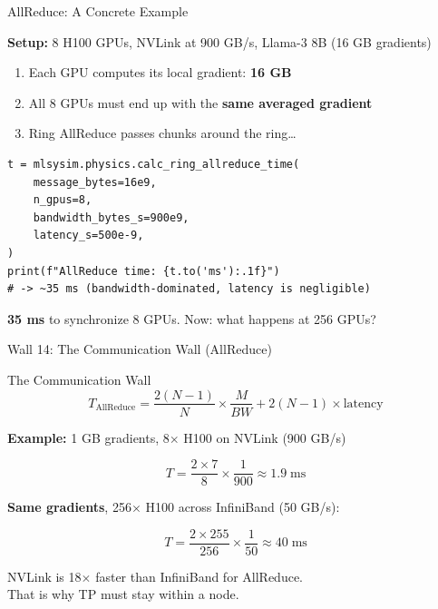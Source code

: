 \documentclass[aspectratio=169, 12pt]{beamer}
\newcommand{\wallbox}[2]{%
  \begin{block}{#1}#2\end{block}%
}
\begin{document}
\begin{frame}[fragile]{AllReduce: A Concrete Example}

\small
\textbf{Setup:} 8 H100 GPUs, NVLink at 900 GB/s, Llama-3 8B (16 GB gradients)

\vspace{0.3cm}
\begin{enumerate}
\item Each GPU computes its local gradient: \textbf{16 GB}
\item All 8 GPUs must end up with the \textbf{same averaged gradient}
\item Ring AllReduce passes chunks around the ring\ldots
\end{enumerate}

\vspace{0.3cm}
\begin{lstlisting}
t = mlsysim.physics.calc_ring_allreduce_time(
    message_bytes=16e9,
    n_gpus=8,
    bandwidth_bytes_s=900e9,
    latency_s=500e-9,
)
print(f"AllReduce time: {t.to('ms'):.1f}")
# -> ~35 ms (bandwidth-dominated, latency is negligible)
\end{lstlisting}

\vfill
\centering
\textbf{35 ms} to synchronize 8 GPUs. Now: what happens at 256 GPUs?
\end{frame}

\begin{frame}{Wall 14: The Communication Wall (AllReduce)}

\small
\wallbox{The Communication Wall}{
\[
  T_{\text{AllReduce}} = \frac{2(N-1)}{N} \times \frac{M}{BW}
    + 2(N-1) \times \text{latency}
\]
}

\vspace{0.2cm}
\textbf{Example:} 1 GB gradients, 8$\times$ H100 on NVLink (900 GB/s)

\[
T = \frac{2 \times 7}{8} \times \frac{1}{900} \approx 1.9\;\text{ms}
\]

\vspace{0.2cm}
\textbf{Same gradients}, 256$\times$ H100 across InfiniBand (50 GB/s):

\[
T = \frac{2 \times 255}{256} \times \frac{1}{50} \approx 40\;\text{ms}
\]

\vspace{0.2cm}
\alert{NVLink is 18$\times$ faster than InfiniBand for AllReduce.\\
That is why TP must stay within a node.}
\end{frame}
\end{document}
